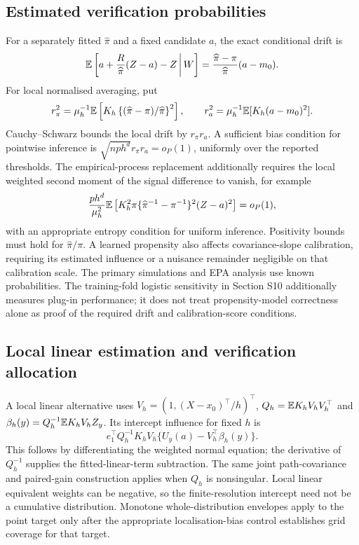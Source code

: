 \subsection{Estimated verification probabilities}
For a separately fitted $\widehat\pi$ and a fixed candidate $a$, the exact conditional drift is
\begin{equation}
 \mathbb E\left[a+\frac R{\widehat\pi}(Z-a)-Z\,\middle|\,W\right]
 =\frac{\widehat\pi-\pi}{\widehat\pi}(a-m_0).
\end{equation}
For local normalised averaging, put
\[
 r_\pi^2=\mu_h^{-1}\mathbb E\left[K_h
 \left\{(\widehat\pi-\pi)/\widehat\pi\right\}^2\right],\qquad
 r_a^2=\mu_h^{-1}\mathbb E[K_h(a-m_0)^2].
\]
Cauchy--Schwarz bounds the local drift by $r_\pi r_a$. A sufficient bias condition for pointwise inference is $\sqrt{nph^d}r_\pi r_a=o_P(1)$, uniformly over the reported thresholds. The empirical-process replacement additionally requires the local weighted second moment of the signal difference to vanish, for example
\[
 \frac{ph^d}{\mu_h^2}\mathbb E\left[K_h^2\pi
 \{\widehat\pi^{-1}-\pi^{-1}\}^2(Z-a)^2\right]=o_P(1),
\]
with an appropriate entropy condition for uniform inference. Positivity bounds must hold for $\widehat\pi/\pi$. A learned propensity also affects covariance-slope calibration, requiring its estimated influence or a nuisance remainder negligible on that calibration scale. The primary simulations and EPA analysis use known probabilities. The training-fold logistic sensitivity in Section S10 additionally measures plug-in performance; it does not treat propensity-model correctness alone as proof of the required drift and calibration-score conditions.

\subsection{Local linear estimation and verification allocation}
A local linear alternative uses $V_h=(1,(X-x_0)^\top/h)^\top$, $Q_h=\mathbb E K_hV_hV_h^\top$ and
$\beta_h(y)=Q_h^{-1}\mathbb E K_hV_hZ_y$. Its intercept influence for fixed $h$ is
\[
 e_1^\top Q_h^{-1}K_hV_h\{U_y(a)-V_h^\top\beta_h(y)\}.
\]
This follows by differentiating the weighted normal equation; the derivative of $Q_h^{-1}$ supplies the fitted-linear-term subtraction. The same joint path-covariance and paired-gain construction applies when $Q_h$ is nonsingular. Local linear equivalent weights can be negative, so the finite-resolution intercept need not be a cumulative distribution. Monotone whole-distribution envelopes apply to the point target only after the appropriate localisation-bias control establishes grid coverage for that target.

